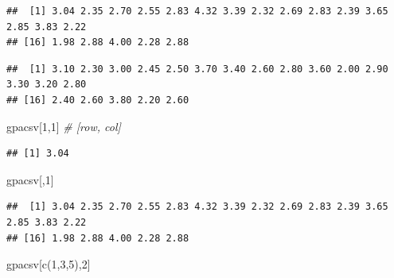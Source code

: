 \documentclass[
]{book}
\newenvironment{Shaded}{\begin{snugshade}}{\end{snugshade}}
\newcommand{\CommentTok}[1]{\textcolor[rgb]{0.56,0.35,0.01}{\textit{#1}}}
\newcommand{\DecValTok}[1]{\textcolor[rgb]{0.00,0.00,0.81}{#1}}
\newcommand{\FunctionTok}[1]{\textcolor[rgb]{0.00,0.00,0.00}{#1}}
\newcommand{\NormalTok}[1]{#1}
\newcommand{\SpecialCharTok}[1]{\textcolor[rgb]{0.00,0.00,0.00}{#1}}
\theoremstyle{definition}
\theoremstyle{definition}
\theoremstyle{definition}
\theoremstyle{definition}
\theoremstyle{remark}
\begin{document}
\begin{Shaded}
\end{Shaded}

\begin{verbatim}
##  [1] 3.04 2.35 2.70 2.55 2.83 4.32 3.39 2.32 2.69 2.83 2.39 3.65 2.85 3.83 2.22
## [16] 1.98 2.88 4.00 2.28 2.88
\end{verbatim}

\begin{Shaded}
\end{Shaded}

\begin{verbatim}
##  [1] 3.10 2.30 3.00 2.45 2.50 3.70 3.40 2.60 2.80 3.60 2.00 2.90 3.30 3.20 2.80
## [16] 2.40 2.60 3.80 2.20 2.60
\end{verbatim}

\begin{Shaded}
\begin{Highlighting}[]
\NormalTok{gpacsv[}\DecValTok{1}\NormalTok{,}\DecValTok{1}\NormalTok{] }\CommentTok{\# [row, col]}
\end{Highlighting}
\end{Shaded}

\begin{verbatim}
## [1] 3.04
\end{verbatim}

\begin{Shaded}
\begin{Highlighting}[]
\NormalTok{gpacsv[,}\DecValTok{1}\NormalTok{]}
\end{Highlighting}
\end{Shaded}

\begin{verbatim}
##  [1] 3.04 2.35 2.70 2.55 2.83 4.32 3.39 2.32 2.69 2.83 2.39 3.65 2.85 3.83 2.22
## [16] 1.98 2.88 4.00 2.28 2.88
\end{verbatim}

\begin{Shaded}
\begin{Highlighting}[]
\NormalTok{gpacsv[}\FunctionTok{c}\NormalTok{(}\DecValTok{1}\NormalTok{,}\DecValTok{3}\NormalTok{,}\DecValTok{5}\NormalTok{),}\DecValTok{2}\NormalTok{]}
\end{Highlighting}
\end{Shaded}
\end{document}
